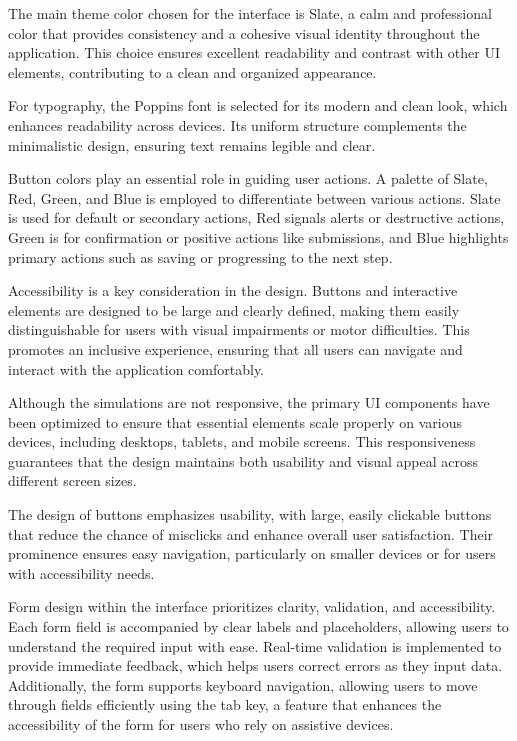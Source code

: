 The main theme color chosen for the interface is Slate, a calm and professional color that provides consistency and a cohesive visual identity throughout the application. This choice ensures excellent readability and contrast with other UI elements, contributing to a clean and organized appearance.

For typography, the Poppins font is selected for its modern and clean look, which enhances readability across devices. Its uniform structure complements the minimalistic design, ensuring text remains legible and clear.

Button colors play an essential role in guiding user actions. A palette of Slate, Red, Green, and Blue is employed to differentiate between various actions. Slate is used for default or secondary actions, Red signals alerts or destructive actions, Green is for confirmation or positive actions like submissions, and Blue highlights primary actions such as saving or progressing to the next step.

Accessibility is a key consideration in the design. Buttons and interactive elements are designed to be large and clearly defined, making them easily distinguishable for users with visual impairments or motor difficulties. This promotes an inclusive experience, ensuring that all users can navigate and interact with the application comfortably.

Although the simulations are not responsive, the primary UI components have been optimized to ensure that essential elements scale properly on various devices, including desktops, tablets, and mobile screens. This responsiveness guarantees that the design maintains both usability and visual appeal across different screen sizes.

The design of buttons emphasizes usability, with large, easily clickable buttons that reduce the chance of misclicks and enhance overall user satisfaction. Their prominence ensures easy navigation, particularly on smaller devices or for users with accessibility needs.

Form design within the interface prioritizes clarity, validation, and accessibility. Each form field is accompanied by clear labels and placeholders, allowing users to understand the required input with ease. Real-time validation is implemented to provide immediate feedback, which helps users correct errors as they input data. Additionally, the form supports keyboard navigation, allowing users to move through fields efficiently using the tab key, a feature that enhances the accessibility of the form for users who rely on assistive devices.


